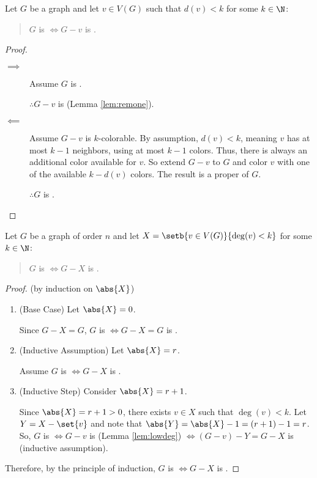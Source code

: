 \begin{lemma}
  \label{lem:lowdeg}
  Let \(G\) be a graph and let \(v\in V(G)\) such that \(d(v)<k\) for some \(k\in\N\):
  \begin{quote}
    \(G\) is  \(\iff G-v\) is .
  \end{quote}
\end{lemma}

\begin{proof}
  \begin{description}
  \item[]
  \item[\(\implies\)] Assume \(G\) is .

    \(\therefore G-v\) is  (Lemma \ref{lem:remone}).

  \item[\(\impliedby\)] Assume \(G-v\) is \(k\)-colorable.
    By assumption, \(d(v)<k\), meaning \(v\) has at most \(k-1\) neighbors, using at most \(k-1\) colors.  Thus, there is
    always an additional color available for \(v\).  So extend \(G-v\) to \(G\) and color \(v\) with one of the available
    \(k-d(v)\) colors.  The result is a proper  of \(G\).

    \(\therefore G\) is .
  \end{description}
\end{proof}

\begin{corollary}
  \label{cor:lowdeg}
  Let \(G\) be a graph of order \(n\) and let \(X=\setb{v\in V(G)}{\deg(v)<k}\) for some \(k\in\N\):
  \begin{quote}
    \(G\) is  \(\iff G-X\) is .
  \end{quote}
\end{corollary}

\begin{proof}
  (by induction on \(\abs{X}\))
  \begin{enumerate}
  \item (Base Case) Let \(\abs{X}=0\).

    Since \(G-X=G\), \(G\) is  \(\iff G-X=G\) is .

  \item (Inductive Assumption) Let \(\abs{X}=r\).

    Assume \(G\) is  \(\iff G-X\) is .

  \item (Inductive Step) Consider \(\abs{X}=r+1\).
    
    Since \(\abs{X}=r+1>0\), there exists \(v\in X\) such that \(\deg(v)<k\).  Let \(Y=X-\set{v}\) and note that
    \(\abs{Y}=\abs{X}-1=(r+1)-1=r\).  So, \(G\) is  \(\iff G-v\) is  (Lemma \ref{lem:lowdeg}) \(\iff
    (G-v)-Y=G-X\) is  (inductive assumption).
  \end{enumerate}

  Therefore, by the principle of induction, \(G\) is  \(\iff G-X\) is .
\end{proof}

